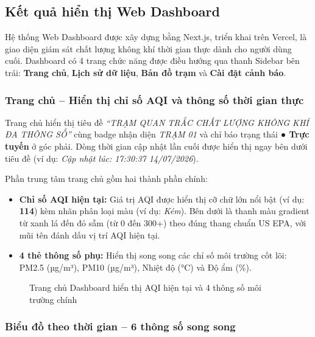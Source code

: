 \documentclass[12pt,a4paper]{article}
\begin{document}
\subsection{Kết quả hiển thị Web Dashboard}
Hệ thống Web Dashboard được xây dựng bằng Next.js, triển khai trên Vercel, là giao diện giám sát chất lượng không khí thời gian thực dành cho người dùng cuối. Dashboard có 4 trang chức năng được điều hướng qua thanh Sidebar bên trái: \textbf{Trang chủ}, \textbf{Lịch sử dữ liệu}, \textbf{Bản đồ trạm} và \textbf{Cài đặt cảnh báo}.

\subsubsection{Trang chủ -- Hiển thị chỉ số AQI và thông số thời gian thực}

Trang chủ hiển thị tiêu đề \textit{``TRẠM QUAN TRẮC CHẤT LƯỢNG KHÔNG KHÍ ĐA THÔNG SỐ''} cùng badge nhận diện \textit{TRẠM 01} và chỉ báo trạng thái \textbf{● Trực tuyến} ở góc phải. Dòng thời gian cập nhật lần cuối được hiển thị ngay bên dưới tiêu đề (ví dụ: \textit{Cập nhật lúc: 17:30:37 14/07/2026}).

Phần trung tâm trang chủ gồm hai thành phần chính:
\begin{itemize}
    \item \textbf{Chỉ số AQI hiện tại:} Giá trị AQI được hiển thị cỡ chữ lớn nổi bật (ví dụ: \textbf{114}) kèm nhãn phân loại màu (ví dụ: \textit{Kém}). Bên dưới là thanh màu gradient từ xanh lá đến đỏ sẫm (từ 0 đến 300+) theo đúng thang chuẩn US EPA, với mũi tên đánh dấu vị trí AQI hiện tại.
    \item \textbf{4 thẻ thông số phụ:} Hiển thị song song các chỉ số môi trường cốt lõi: PM2.5 (µg/m³), PM10 (µg/m³), Nhiệt độ (°C) và Độ ẩm (\%).
\end{itemize}

\begin{figure}[H]
    \centering
    \caption{Trang chủ Dashboard hiển thị AQI hiện tại và 4 thông số môi trường chính}
    \label{fig:dashboard_home}
\end{figure}

\subsubsection{Biểu đồ theo thời gian -- 6 thông số song song}
\end{document}
